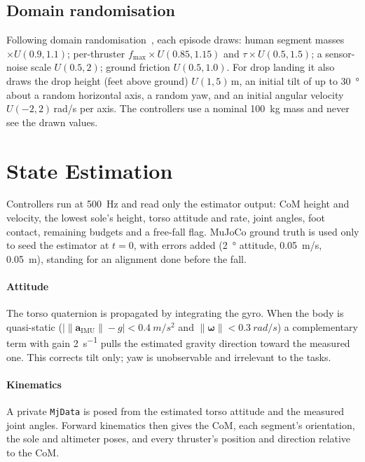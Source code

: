 \documentclass[conference]{IEEEtran}
\newcommand{\vect}[1]{\boldsymbol{#1}}
\begin{document}
\subsection{Domain randomisation}
Following domain randomisation~\cite{tobin2017dr}, each episode draws: human segment masses $\times U(0.9,1.1)$; per-thruster $f_{\max}\times U(0.85,1.15)$ and $\tau\times U(0.5,1.5)$; a sensor-noise scale $U(0.5,2)$; ground friction $U(0.5,1.0)$. For drop landing it also draws the drop height (feet above ground) $U(1,5)$\,m, an initial tilt of up to \SI{30}{\degree} about a random horizontal axis, a random yaw, and an initial angular velocity $U(-2,2)$\,\si{rad/s} per axis. The controllers use a nominal \SI{100}{kg} mass and never see the drawn values.

\section{State Estimation}
\label{sec:est}
Controllers run at \SI{500}{Hz} and read only the estimator output: CoM height and velocity, the lowest sole's height, torso attitude and rate, joint angles, foot contact, remaining budgets and a free-fall flag. MuJoCo ground truth is used only to seed the estimator at $t=0$, with errors added (\SI{2}{\degree} attitude, \SI{0.05}{m/s}, \SI{0.05}{m}), standing for an alignment done before the fall.

\paragraph*{Attitude} The torso quaternion is propagated by integrating the gyro. When the body is quasi-static ($\big|\|\vect a_{\text{IMU}}\|-g\big|<\SI{0.4}{m/s^2}$ and $\|\vect\omega\|<\SI{0.3}{rad/s}$) a complementary term with gain \SI{2}{s^{-1}} pulls the estimated gravity direction toward the measured one. This corrects tilt only; yaw is unobservable and irrelevant to the tasks.

\paragraph*{Kinematics} A private \texttt{MjData} is posed from the estimated torso attitude and the measured joint angles. Forward kinematics then gives the CoM, each segment's orientation, the sole and altimeter poses, and every thruster's position and direction relative to the CoM.
\end{document}
